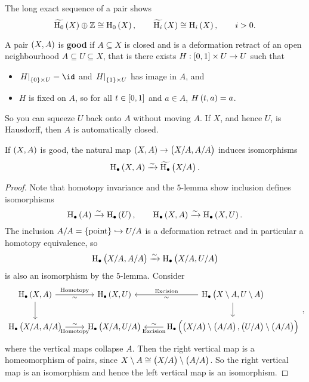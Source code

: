 \begin{exercise*}
The long exact sequence of a pair shows
$$ \widetilde{\H_0}\br{X} \oplus \ZZ \cong \H_0\br{X}, \qquad \widetilde{\H_i}\br{X} \cong \H_i\br{X}, \qquad i > 0. $$
\end{exercise*}

\begin{definition*}
A pair $ \br{X, A} $ is \textbf{good} if $ A \subseteq X $ is closed and is a deformation retract of an open neighbourhood $ A \subseteq U \subseteq X $, that is there exists $ H : \sbr{0, 1} \times U \to U $ such that
\begin{itemize}
\item $ \eval{H}_{\cbr{0} \times U} = \id $ and $ \eval{H}_{\cbr{1} \times U} $ has image in $ A $, and
\item $ H $ is fixed on $ A $, so for all $ t \in \sbr{0, 1} $ and $ a \in A $, $ H\br{t, a} = a $.
\end{itemize}
\end{definition*}

So you can squeeze $ U $ back onto $ A $ without moving $ A $. If $ X $, and hence $ U $, is Hausdorff, then $ A $ is automatically closed.

\begin{proposition}
If $ \br{X, A} $ is good, the natural map $ \br{X, A} \to \br{X / A, A / A} $ induces isomorphisms
$$ \H_\bullet\br{X, A} \xrightarrow{\sim} \widetilde{\H_\bullet}\br{X / A}. $$
\end{proposition}

\begin{proof}
Note that homotopy invariance and the $ 5 $-lemma show inclusion defines isomorphisms
$$ \H_\bullet\br{A} \xrightarrow{\sim} \H_\bullet\br{U}, \qquad \H_\bullet\br{X, A} \xrightarrow{\sim} \H_\bullet\br{X, U}. $$
The inclusion $ A / A = \pt \hookrightarrow U / A $ is a deformation retract and in particular a homotopy equivalence, so
$$ \H_\bullet\br{X / A, A / A} \xrightarrow{\sim} \H_\bullet\br{X / A, U / A} $$
is also an isomorphism by the $ 5 $-lemma. Consider
$$
\begin{tikzcd}
\H_\bullet\br{X, A} \arrow{r}{\text{Homotopy}}[swap]{\sim} \arrow{d} & \H_\bullet\br{X, U} & \H_\bullet\br{X \setminus A, U \setminus A} \arrow{l}{\sim}[swap]{\text{Excision}} \arrow{d} \\
\H_\bullet\br{X / A, A / A} \arrow{r}{\sim}[swap]{\text{Homotopy}} & \H_\bullet\br{X / A, U / A} & \H_\bullet\br{\br{X / A} \setminus \br{A / A}, \br{U / A} \setminus \br{A / A}} \arrow{l}{\text{Excision}}[swap]{\sim}
\end{tikzcd},
$$
where the vertical maps collapse $ A $. Then the right vertical map is a homeomorphism of pairs, since $ X \setminus A \cong \br{X / A} \setminus \br{A / A} $. So the right vertical map is an isomorphism and hence the left vertical map is an isomorphism.
\end{proof}

